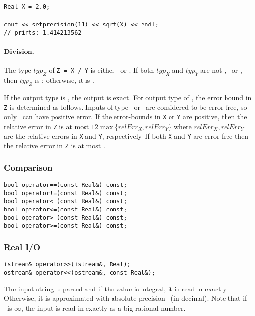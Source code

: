 \nopagebreak
\begin{progb}{
\> \tt Real X = 2.0; \\
\\
\> \tt cout << setprecision(11) << sqrt(X) << endl; \\
\> // prints: 1.414213562
}\end{progb}

\paragraph{Division.}
The type $typ_Z$ of {\tt Z = X / Y} is either \Rat\ or \BF. 
If both $typ_X$ and $typ_Y$ are not \float, \double\ or \BF, then
$typ_Z$ is \Rat; otherwise, it is \BF.

If the output type is \Rat, the output is exact.
For output type of \BF, the error bound in {\tt Z} is determined as follows.
Inputs of type \float\ or \double\ are considered to be error-free,
so only \BF\ can have positive error.
If the error-bounds in {\tt X} or {\tt Y} are positive, then
the relative error in {\tt Z} is at most $12\max\{relErr_X,relErr_Y\}$
where $relErr_X,relErr_Y$ are the relative errors in {\tt X}
and {\tt Y}, respectively.
If both {\tt X} and {\tt Y} are error-free then the
relative error in {\tt Z} is at most .


\subsubsection{Comparison}
\begin{progb} {
\> \tt	bool operator==(const Real\&) const;\\
\> \tt	bool operator!=(const Real\&) const;\\
\> \tt	bool operator< (const Real\&) const;\\
\> \tt	bool operator<=(const Real\&) const;\\
\> \tt	bool operator> (const Real\&) const;\\
\> \tt	bool operator>=(const Real\&) const;
}\end{progb}

\subsubsection{Real I/O}
\label{sec-real-out}

\begin{progb} {
\> \tt  istream\& operator>>(istream\&, Real);\\
\> \tt  ostream\& operator<<(ostream\&, const Real\&);
}\end{progb}
The input string is parsed and if the value is integral, it is
read in exactly. Otherwise, it is approximated with absolute
precision \ (in decimal). Note that if
\ is $\infty$, the input is read in exactly
as a big rational number. 

